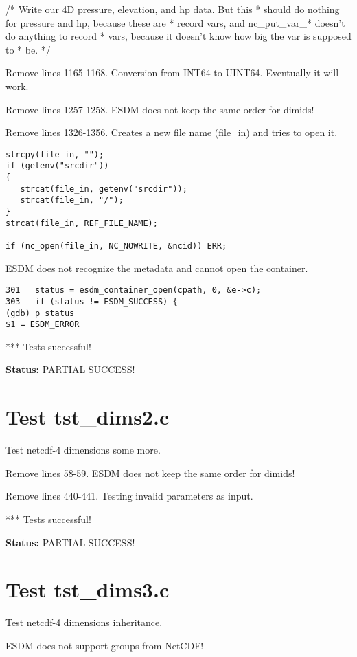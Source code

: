 /* Write our 4D pressure, elevation, and hp data. But this
 * should do nothing for pressure and hp, because these are
 * record vars, and nc\_put\_var\_* doesn't do anything to record
 * vars, because it doesn't know how big the var is supposed to
 * be. */

Remove lines 1165-1168. Conversion from INT64 to UINT64. Eventually it will work.

Remove lines 1257-1258. ESDM does not keep the same order for dimids!

Remove lines 1326-1356. Creates a new file name (file\_in) and tries to open it.

\begin{verbatim}
strcpy(file_in, "");
if (getenv("srcdir"))
{
   strcat(file_in, getenv("srcdir"));
   strcat(file_in, "/");
}
strcat(file_in, REF_FILE_NAME);

if (nc_open(file_in, NC_NOWRITE, &ncid)) ERR;
\end{verbatim}

ESDM does not recognize the metadata and cannot open the container.

\begin{verbatim}
301	  status = esdm_container_open(cpath, 0, &e->c);
303	  if (status != ESDM_SUCCESS) {
(gdb) p status
$1 = ESDM_ERROR
\end{verbatim}

*** Tests successful!

{\bf \large Status: } PARTIAL SUCCESS!

\section{Test tst\_dims2.c}

Test netcdf-4 dimensions some more.

Remove lines 58-59. ESDM does not keep the same order for dimids!

Remove lines 440-441. Testing invalid parameters as input.

*** Tests successful!

{\bf \large Status: } PARTIAL SUCCESS!

\section{Test tst\_dims3.c}

Test netcdf-4 dimensions inheritance.

ESDM does not support groups from NetCDF!

